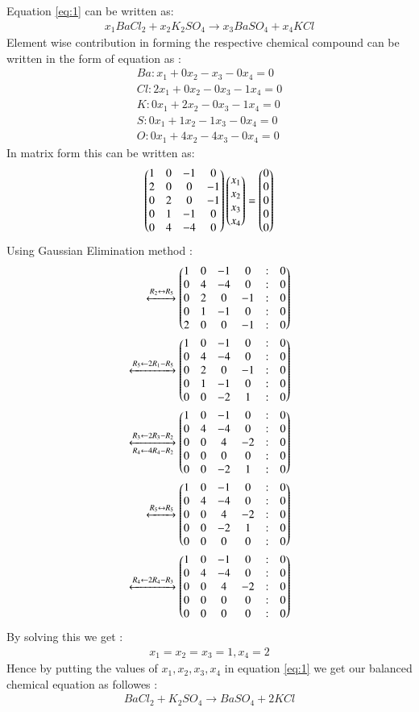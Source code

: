 \documentclass[journal,12pt,twocolumn]{IEEEtran}
\begin{document}
Equation \eqref{eq:1} can be written as:
\begin{align}
x_1BaCl_2 + x_2K_2SO_4 \rightarrow x_3BaSO_4 + x_4KCl\label{eq:2}
\end{align}
Element wise contribution in forming the respective chemical compound can be written in the form of equation as :
\begin{align}
Ba : x_1 + 0x_2 - x_3 - 0x_4 = 0\\
Cl : 2x_1 + 0x_2 - 0x_3 - 1x_4 = 0\\
K  : 0x_1 + 2x_2 - 0x_3 - 1x_4 = 0\\
S  : 0x_1 + 1x_2 - 1x_3 - 0x_4 = 0\\
O  : 0x_1 + 4x_2 - 4x_3 - 0x_4 = 0
\end{align}
In matrix form this can be written as:
\begin{align}
  \begin{pmatrix}1&0&-1&0\\2&0&0&-1\\0&2&0&-1\\0&1&-1&0\\0&4&-4&0\end{pmatrix}\begin{pmatrix}x_1\\x_2\\x_3\\x_4\end{pmatrix}=\begin{pmatrix}0\\0\\0\\0\\0\end{pmatrix}
\end{align}
Using Gaussian Elimination method :
\begin{align}
\xleftrightarrow{R_2 \leftrightarrow R_5}\begin{pmatrix}1&0&-1&0&:&0\\0&4&-4&0&:&0\\0&2&0&-1&:&0\\0&1&-1&0&:&0\\2&0&0&-1&:&0\end{pmatrix}\\
\xleftrightarrow{R_5 \leftarrow 2R_1-R_5}\begin{pmatrix}1&0&-1&0&:&0\\0&4&-4&0&:&0\\0&2&0&-1&:&0\\0&1&-1&0&:&0\\0&0&-2&1&:&0\end{pmatrix}\\
\xleftrightarrow[R_4 \leftarrow 4R_4-R_2]{R_3 \leftarrow 2R_3-R_2}\begin{pmatrix}1&0&-1&0&:&0\\0&4&-4&0&:&0\\0&0&4&-2&:&0\\0&0&0&0&:&0\\0&0&-2&1&:&0\end{pmatrix}\\
\xleftrightarrow{R_5 \leftrightarrow R_5}\begin{pmatrix}1&0&-1&0&:&0\\0&4&-4&0&:&0\\0&0&4&-2&:&0\\0&0&-2&1&:&0\\0&0&0&0&:&0\end{pmatrix}\\
\xleftrightarrow{R_4 \leftarrow 2R_4-R_3}\begin{pmatrix}1&0&-1&0&:&0\\0&4&-4&0&:&0\\0&0&4&-2&:&0\\0&0&0&0&:&0\\0&0&0&0&:&0\end{pmatrix}
\end{align}
By solving this we get : 
\begin{align}
    x_1=x_2=x_3=1,x_4=2
\end{align}
Hence by putting the values of $x_1,x_2,x_3,x_4$ in equation \eqref{eq:1} we get our balanced chemical equation as followes :
\begin{align}
BaCl_2 + K_2SO_4 \rightarrow BaSO_4 + 2KCl
\end{align}
\end{document}
